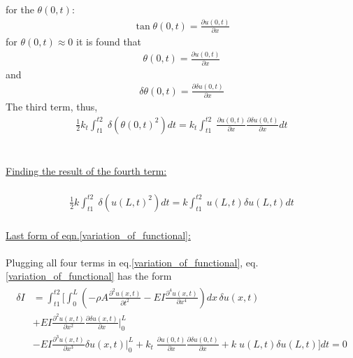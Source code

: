 \documentclass[]{report}
\begin{document}
for the $\theta{\left(0,t\right)}$:
\begin{eqnarray*}
\tan{\theta{\left(0,t\right)}}=\frac{\partial{u{\left(0,t\right)}}}{\partial{x}}
\end{eqnarray*}
for $\theta{\left(0,t\right)}\approx 0$ it is found that
\begin{eqnarray*}
{\theta{\left(0,t\right)}}=\frac{\partial{u{\left(0,t\right)}}}{\partial{x}}
\end{eqnarray*}
and
\begin{eqnarray*}
\delta \theta{\left(0,t\right)}=\frac{\partial{\delta u{\left(0,t\right)}}}{\partial{x}}
\end{eqnarray*}
The third term, thus, 
\begin{eqnarray*}
\frac{1}{2}k_t \int_{t1}^{t2} \;\delta \left({\theta{\left(0,t\right)}}^2\right)dt=k_t \int_{t1}^{t2} \; \frac{\partial{u{\left(0,t\right)}}}{\partial{x}} \frac{\partial{\delta u{\left(0,t\right)}}}{\partial{x}}dt
\end{eqnarray*}\\
\\
\underline{Finding the result of the fourth term:}\\
\\
\begin{eqnarray*}
\frac{1}{2} k \int_{t1}^{t2} \; \delta \left( {u \left(L,t\right)}^2\right)dt= k \int_{t1}^{t2} \;u \left(L,t\right) \delta  u \left(L,t\right)dt
\end{eqnarray*}
\\
\underline{Last form of eqn.\ref{variation_of_functional}:}\\
\\
Plugging all four terms in eq.\ref{variation_of_functional}, eq.\ref{variation_of_functional} has the form
\begin{eqnarray}
\begin{split}
\delta I &=
\int_{t1}^{t2} \biggl[ \int_{0}^{L}  \left(-\rho A \frac{\partial^2{ u\left(x,t\right)}}{\partial{t^2}} -E I\frac{\partial^4{u\left(x,t\right)}}{\partial{x^4}}\right)  dx\,{\delta u\left(x,t\right)} \\
&+E I\frac{\partial^2{u\left(x,t\right)}}{\partial{x^2}} \frac{\partial{\delta u\left(x,t\right)}}{\partial x}{|}_{0}^{L}\\ 
&-E I\frac{\partial^3{u\left(x,t\right)}}{\partial{x^3}} {\delta u\left(x,t\right)}{|}_{0}^{L} +k_t  \; \frac{\partial{u{\left(0,t\right)}}}{\partial{x}} \frac{\partial{\delta u{\left(0,t\right)}}}{\partial{x}}+k  \;u \left(L,t\right) \delta  u \left(L,t\right) \biggr]dt=0
\end{split}
\end{eqnarray}
\end{document}
